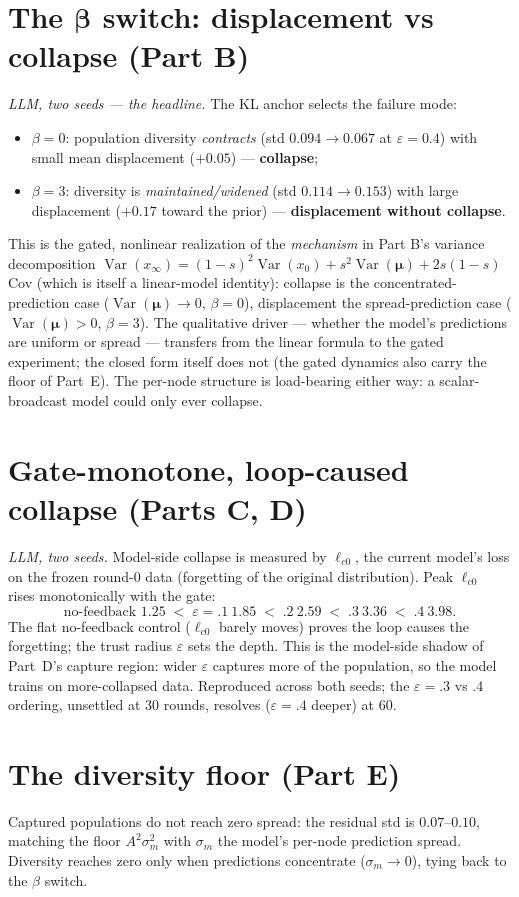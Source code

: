 \documentclass[11pt]{article}
\DeclareMathOperator{\Var}{Var}
\begin{document}
\section{The $\bm\beta$ switch: displacement vs collapse (Part B)}
\emph{LLM, two seeds --- the headline.} The KL anchor selects the failure mode:
\begin{itemize}
\item $\beta=0$: population diversity \emph{contracts} (std $0.094\to0.067$ at
$\varepsilon=0.4$) with small mean displacement ($+0.05$) --- \textbf{collapse};
\item $\beta=3$: diversity is \emph{maintained/widened} (std $0.114\to0.153$) with large
displacement ($+0.17$ toward the prior) --- \textbf{displacement without collapse}.
\end{itemize}
This is the gated, nonlinear realization of the \emph{mechanism} in Part B's variance
decomposition $\Var(x_\infty)=(1-s)^2\Var(x_0)+s^2\Var(\bm\mu)+2s(1-s)\,$Cov (which is
itself a linear-model identity): collapse is the concentrated-prediction case
($\Var(\bm\mu)\to0$, $\beta=0$), displacement the spread-prediction case
($\Var(\bm\mu)>0$, $\beta=3$). The qualitative driver --- whether the model's predictions
are uniform or spread --- transfers from the linear formula to the gated experiment;
the closed form itself does not (the gated dynamics also carry the floor of Part~E). The
per-node structure is load-bearing either way: a scalar-broadcast model could only ever
collapse.

\section{Gate-monotone, loop-caused collapse (Parts C, D)}
\emph{LLM, two seeds.} Model-side collapse is measured by $\ell_{c0}$, the current
model's loss on the frozen round-0 data (forgetting of the original distribution). Peak
$\ell_{c0}$ rises monotonically with the gate:
\[
\text{no-feedback }1.25 \;<\; \varepsilon{=}.1\ 1.85 \;<\; .2\ 2.59 \;<\; .3\ 3.36 \;<\; .4\ 3.98 .
\]
The flat no-feedback control ($\ell_{c0}$ barely moves) proves the loop causes the
forgetting; the trust radius $\varepsilon$ sets the depth. This is the model-side
shadow of Part~D's capture region: wider $\varepsilon$ captures more of the population,
so the model trains on more-collapsed data. Reproduced across both seeds; the
$\varepsilon{=}.3$ vs $.4$ ordering, unsettled at 30 rounds, resolves
($\varepsilon{=}.4$ deeper) at 60.

\section{The diversity floor (Part E)}
Captured populations do not reach zero spread: the residual std is $0.07$--$0.10$,
matching the floor $A^2\sigma_m^2$ with $\sigma_m$ the model's per-node prediction
spread. Diversity reaches zero only when predictions concentrate ($\sigma_m\to0$),
tying back to the $\beta$ switch.
\end{document}
